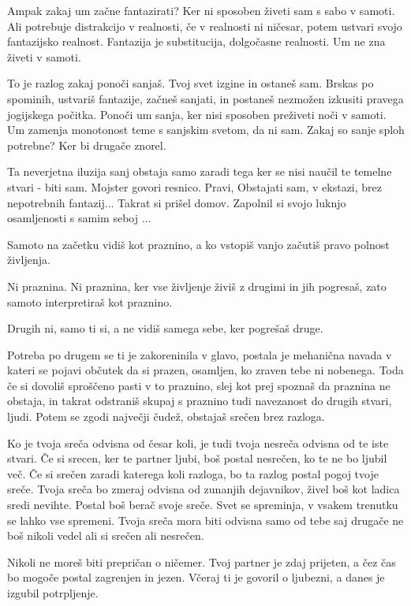 Ampak zakaj um začne fantazirati? Ker ni sposoben živeti sam s sabo v samoti. Ali potrebuje distrakcijo v realnosti, če v realnosti ni ničesar, potem ustvari svojo fantazijsko realnost. Fantazija je substitucija, dolgočasne realnosti. Um ne zna živeti v samoti. 

To je razlog zakaj ponoči sanjaš. Tvoj svet izgine in ostaneš sam. Brskas po spominih, ustvariš fantazije, začneš sanjati, in postaneš nezmožen izkusiti pravega jogijskega počitka. Ponoči um sanja, ker nisi sposoben preživeti noči v samoti. Um zamenja monotonost teme s sanjskim svetom, da ni sam. Zakaj so sanje sploh potrebne? Ker bi drugače znorel. 

Ta neverjetna iluzija sanj obstaja samo zaradi tega ker se nisi naučil te temelne stvari - biti sam. Mojster govori resnico. Pravi,  Obstajati sam, v ekstazi, brez nepotrebnih fantazij... Takrat si prišel domov. Zapolnil si svojo luknjo osamljenosti s samim seboj ... 

Samoto na začetku vidiš kot praznino, a ko vstopiš vanjo začutiš pravo polnost življenja. 

Ni praznina. Ni praznina, ker vse življenje živiš z drugimi in jih pogresaš, zato samoto interpretiraš kot praznino. 

Drugih ni, samo ti si, a ne vidiš samega sebe, ker pogrešaš druge. 

Potreba po drugem se ti je zakoreninila v glavo, postala je mehanična navada v kateri se pojavi občutek da si prazen, osamljen, ko zraven tebe ni nobenega. Toda če si dovoliš sproščeno pasti v to praznino, slej kot prej spoznaš da praznina ne obstaja, in takrat odstraniš skupaj s praznino tudi navezanost do drugih stvari, ljudi. Potem se zgodi največji čudež, obstajaš srečen brez razloga. 

Ko je tvoja sreča odvisna od česar koli, je tudi tvoja nesreča odvisna od te iste stvari. Če si srecen, ker te partner ljubi, boš postal nesrečen, ko te ne bo ljubil več. Če si srečen zaradi katerega koli razloga, bo ta razlog postal pogoj tvoje sreče. Tvoja sreča bo zmeraj odvisna od zunanjih dejavnikov, živel boš kot ladica sredi nevihte. Postal boš berač svoje sreče. Svet se spreminja, v vsakem trenutku se lahko vse spremeni. Tvoja sreča mora biti odvisna samo od tebe saj drugače ne boš nikoli vedel ali si srečen ali nesrečen. 

Nikoli ne moreš biti prepričan o ničemer. Tvoj partner je zdaj prijeten, a čez čas bo mogoče postal zagrenjen in jezen. Včeraj ti je govoril o ljubezni, a danes je izgubil potrpljenje. 

